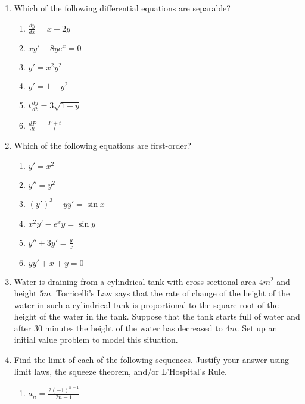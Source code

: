 \documentclass{nosvagor-notes}
\begin{document}
\begin{enumerate}
  \item Which of the following differential equations are separable?
  \begin{multicols}{2}
    \begin{enumerate}
      \item \(\frac{dy}{dx} = x - 2y\)
      \item \(xy' + 8ye^x = 0\)
      \item \(y' = x^2y^2\)
      \item \(y' = 1-y^2\)
      \item \(t \frac{dy}{dt} = 3 \sqrt{1+y} \)
      \item \(\frac{dP}{dt} = \frac{P+t}{t}\)
    \end{enumerate}
  \end{multicols}
  \vspace{256pt}

  \item Which of the following equations are first-order?
    \begin{multicols}{2}
      \begin{enumerate}
        \item \(y' = x^2 \)
        \item \(y'' = y^2\)
        \item \((y')^3 + yy' = \sin x\)
        \item \(x^2y' - e^xy = \sin y\)
        \item \(y'' + 3y' = \frac{y}{x}\)
        \item \(yy' + x + y = 0\)
      \end{enumerate}
    \end{multicols}

  \newpage

  \item Water is draining from a cylindrical tank with cross sectional area
  \(4m^2\) and height \(5m\). Torricelli’s  Law says that the rate of change of the
  height of the water in such a cylindrical tank is proportional to the square
  root of the height of the water in the tank. Suppose that the tank starts
  full of water and after 30 minutes the height of the water has decreased to
  \(4m\). Set up an initial value problem to model this situation.

  \newpage

  \item Find the limit of each of the following sequences. Justify your answer
    using limit laws, the squeeze theorem, and/or L’Hospital’s Rule.
    \begin{enumerate}
      \item \(\displaystyle a_n = \frac{2(-1)^{n+1}}{2n-1}\)
      \vspace{300pt}


\end{enumerate}
\end{enumerate}
\end{document}
